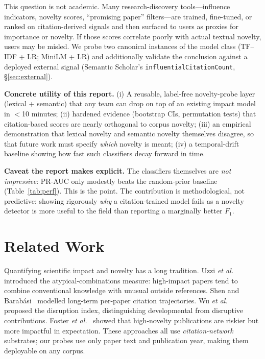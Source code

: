 \documentclass[conference]{IEEEtran}
\begin{document}
This question is not academic. Many research-discovery tools---influence indicators, novelty scores, ``promising paper'' filters---are trained, fine-tuned, or ranked on citation-derived signals and then surfaced to users as proxies for importance or novelty. If those scores correlate poorly with actual textual novelty, users may be misled. We probe two canonical instances of the model class (TF--IDF + LR; MiniLM + LR) and additionally validate the conclusion against a deployed external signal (Semantic Scholar's \texttt{influentialCitationCount}, \S\ref{sec:external}).

\textbf{Concrete utility of this report.} (i) A reusable, label-free novelty-probe layer (lexical + semantic) that any team can drop on top of an existing impact model in $<$10 minutes; (ii) hardened evidence (bootstrap CIs, permutation tests) that citation-based scores are nearly orthogonal to corpus novelty; (iii) an empirical demonstration that lexical novelty and semantic novelty themselves disagree, so that future work must specify \emph{which} novelty is meant; (iv) a temporal-drift baseline showing how fast such classifiers decay forward in time.

\textbf{Caveat the report makes explicit.} The classifiers themselves are \emph{not impressive}: PR-AUC only modestly beats the random-prior baseline (Table~\ref{tab:perf}). This is the point. The contribution is methodological, not predictive: showing rigorously \emph{why} a citation-trained model fails as a novelty detector is more useful to the field than reporting a marginally better $F_1$.

\section{Related Work}
Quantifying scientific impact and novelty has a long tradition. Uzzi \emph{et al.}~\cite{uzzi2013atypical} introduced the atypical-combinations measure: high-impact papers tend to combine conventional knowledge with unusual outside references. Shen and Barab\'asi~\cite{shen2014collective} modelled long-term per-paper citation trajectories. Wu \emph{et al.}~\cite{wang2013disruption} proposed the disruption index, distinguishing developmental from disruptive contributions. Foster \emph{et al.}~\cite{foster2015tradition} showed that high-novelty publications are riskier but more impactful in expectation. These approaches all use \emph{citation-network} substrates; our probes use only paper text and publication year, making them deployable on any corpus.
\end{document}
